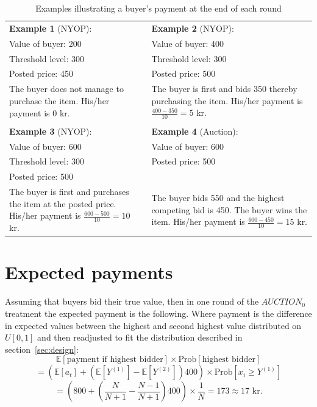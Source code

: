 \documentclass[a4paper,12pt]{article}
\begin{document}
	\begin{table}[ht]
		\caption{Examples illustrating a buyer's payment at the end of each round}
		\begin{tabular}{p{}  p{}}
			{\bf Example 1} (NYOP): 	& {\bf Example 2} (NYOP):  		\\
			Value of buyer: 200 		& Value of buyer: 400 			\\
			Threshold level: 300 		& Threshold level: 300 			\\
			Posted price: 450 			& Posted price: 500 			\\
			The buyer does not manage to purchase the item. His/her payment is 0 kr. & The buyer is first and bids 350 thereby purchasing the item. His/her payment is $\frac{400-350}{10}=5$ kr. \\
			\multicolumn{2}{c}{} \\
			{\bf Example 3} (NYOP):  	& {\bf Example 4} (Auction): 	\\
			Value of buyer: 600 		& Value of buyer: 600  			\\
			Threshold level: 300  		& Posted price: 500  			\\
			Posted price: 500  			&  								\\
			The buyer is first and purchases the item at the posted price. His/her payment is $\frac{600-500}{10}=10$ kr. & The buyer bids 550 and the highest competing bid is 450. The buyer wins the item. His/her payment is $\frac{600-450}{10}=15$ kr. \\
		\end{tabular}
		\label{tab:payment}
	\end{table}

	\section{Expected payments}
	\label{app:expected_payment}
	
	Assuming that buyers bid their true value, then in one round of the $AUCTION_0$ treatment the expected payment is the following. Where payment is the difference in expected values between the highest and second highest value distributed on $U[0,1]$ and then readjusted to fit the distribution described in section~\ref{sec:design}:
	\[ \mathbb{E}[\mbox{payment if highest bidder}] \times \mbox{Prob}[\mbox{highest bidder}] \] 
	\[  = \left( \mathbb{E}[a_t] + (\mathbb{E}[Y^{(1)}]-\mathbb{E}[Y^{(2)}]) 400 \right) \times \mbox{Prob}[x_i \ge Y^{(1)}] \] 
	\[	= \left( 800 + \left(\frac{N}{N+1} - \frac{N-1}{N+1}\right)400 \right) \times \frac{1}{N} = 173 \approx 17\mbox{ kr.} \]
	
\end{document}

